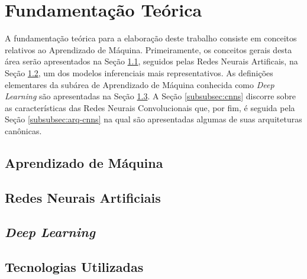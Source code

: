 
\chapter{Fundamentação Teórica} \label{cap:fund-teor}

A fundamentação teórica para a elaboração deste trabalho consiste em conceitos relativos ao Aprendizado de Máquina. Primeiramente, os conceitos gerais desta área serão apresentados na Seção \ref{subsec:ml}, seguidos pelas Redes Neurais Artificais, na Seção \ref{subsec:rna}, um dos modelos inferenciais mais representativos.
As definições elementares da subárea de Aprendizado de Máquina conhecida como \emph{Deep Learning} são apresentadas na Seção \ref{subsec:dl}. A Seção \ref{subsubsec:cnns} discorre sobre as características das Redes Neurais Convolucionais que, por fim, é seguida pela Seção \ref{subsubsec:arq-cnns} na qual são apresentadas algumas de suas arquiteturas canônicas.


\section{Aprendizado de Máquina}
\label{subsec:ml}


\section{Redes Neurais Artificiais}
\label{subsec:rna}


\section{\emph{Deep Learning}}
\label{subsec:dl}


\section{Tecnologias Utilizadas}
\label{subsec:tecnologias}

